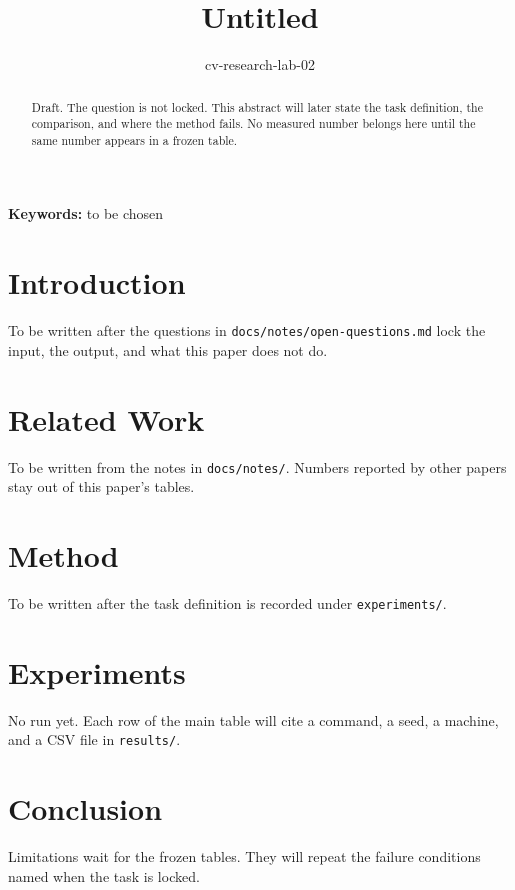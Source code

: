 \documentclass[10pt]{article}
\title{Untitled}
\author{cv-research-lab-02}
\date{}
\begin{document}
\maketitle

\begin{abstract}
Draft. The question is not locked. This abstract will later state the task definition, the comparison, and where the method fails. No measured number belongs here until the same number appears in a frozen table.
\end{abstract}

\noindent\textbf{Keywords:} to be chosen

\section{Introduction}
To be written after the questions in \texttt{docs/notes/open-questions.md} lock the input, the output, and what this paper does not do.

\section{Related Work}
To be written from the notes in \texttt{docs/notes/}. Numbers reported by other papers stay out of this paper's tables.

\section{Method}
To be written after the task definition is recorded under \texttt{experiments/}.

\section{Experiments}
No run yet. Each row of the main table will cite a command, a seed, a machine, and a CSV file in \texttt{results/}.

\section{Conclusion}
Limitations wait for the frozen tables. They will repeat the failure conditions named when the task is locked.
\end{document}
